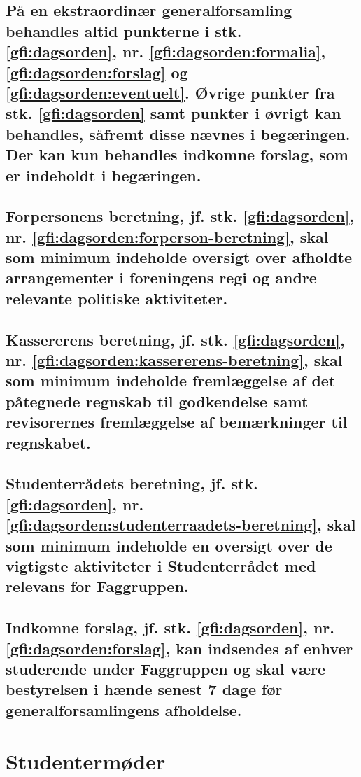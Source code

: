 \documentclass[10pt, danish]{article}
\begin{document}
        \subsection{På en ekstraordinær generalforsamling behandles altid punkterne i stk. \ref{gfi:dagsorden}, nr. \ref{gfi:dagsorden:formalia}, \ref{gfi:dagsorden:forslag} og \ref{gfi:dagsorden:eventuelt}. Øvrige punkter fra stk. \ref{gfi:dagsorden} samt punkter i øvrigt kan behandles, såfremt disse nævnes i begæringen. Der kan kun behandles indkomne forslag, som er indeholdt i begæringen.}\label{gfi:ekstra}
	
        \subsection{Forpersonens beretning, jf. stk. \ref{gfi:dagsorden}, nr. \ref{gfi:dagsorden:forperson-beretning}, skal som minimum indeholde oversigt over afholdte arrangementer i foreningens regi og andre relevante politiske aktiviteter.}
	
        \subsection{Kassererens beretning, jf. stk. \ref{gfi:dagsorden}, nr. \ref{gfi:dagsorden:kassererens-beretning}, skal som minimum indeholde fremlæggelse af det påtegnede regnskab til godkendelse samt revisorernes fremlæggelse af bemærkninger til regnskabet.}
	
        \subsection{Studenterrådets beretning, jf. stk. \ref{gfi:dagsorden}, nr. \ref{gfi:dagsorden:studenterraadets-beretning}, skal som minimum indeholde en oversigt over de vigtigste aktiviteter i Studenterrådet med relevans for Faggruppen.}
	
        \subsection{Indkomne forslag, jf. stk. \ref{gfi:dagsorden}, nr. \ref{gfi:dagsorden:forslag}, kan indsendes af enhver studerende under Faggruppen og skal være bestyrelsen i hænde senest 7 dage før generalforsamlingens afholdelse.}
	
	\section{Studentermøder}
	
\end{document}
